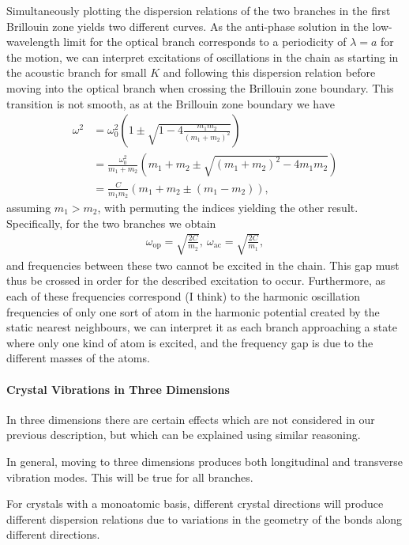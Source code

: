Simultaneously plotting the dispersion relations of the two branches in the first Brillouin zone yields two different curves. As the anti-phase solution in the low-wavelength limit for the optical branch corresponds to a periodicity of $\lambda = a$ for the motion, we can interpret excitations of oscillations in the chain as starting in the acoustic branch for small $K$ and following this dispersion relation before moving into the optical branch when crossing the Brillouin zone boundary. This transition is not smooth, as at the Brillouin zone boundary we have
\begin{align*}
	\omega^{2} &= \omega_{0}^{2}\left(1 \pm \sqrt{1 - 4\frac{m_{1}m_{2}}{(m_{1} + m_{2})^{2}}}\right) \\
	           &= \frac{\omega_{0}^{2}}{m_{1} + m_{2}}\left(m_{1} + m_{2} \pm \sqrt{(m_{1} + m_{2})^{2} - 4m_{1}m_{2}}\right) \\
	           &= \frac{C}{m_{1}m_{2}}\left(m_{1} + m_{2} \pm (m_{1} - m_{2})\right),
\end{align*}
assuming $m_{1} > m_{2}$, with permuting the indices yielding the other result. Specifically, for the two branches we obtain
\begin{align*}
	\omega_{\text{op}} = \sqrt{\frac{2C}{m_{2}}},\ \omega_{\text{ac}} = \sqrt{\frac{2C}{m_{1}}},
\end{align*}
and frequencies between these two cannot be excited in the chain. This gap must thus be crossed in order for the described excitation to occur. Furthermore, as each of these frequencies correspond (I think) to the harmonic oscillation frequencies of only one sort of atom in the harmonic potential created by the static nearest neighbours, we can interpret it as each branch approaching a state where only one kind of atom is excited, and the frequency gap is due to the different masses of the atoms.

\paragraph{Crystal Vibrations in Three Dimensions}
In three dimensions there are certain effects which are not considered in our previous description, but which can be explained using similar reasoning.

In general, moving to three dimensions produces both longitudinal and transverse vibration modes. This will be true for all branches.

For crystals with a monoatomic basis, different crystal directions will produce different dispersion relations due to variations in the geometry of the bonds along different directions.

